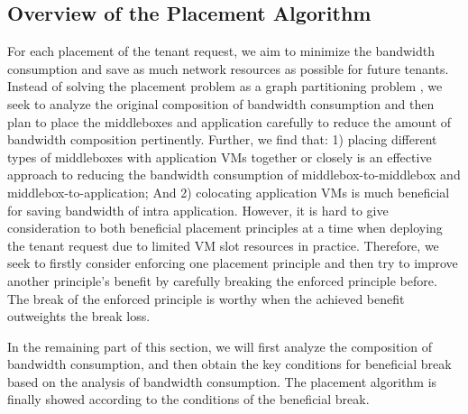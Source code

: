 \documentclass[review]{elsarticle}
\begin{document}

\subsection{Overview of the Placement Algorithm}
For each placement of the tenant request, we aim to minimize the bandwidth consumption and save as much network resources as possible for future tenants. Instead of solving the placement problem as a graph partitioning problem \cite{stratos12}, we seek to analyze the original composition of bandwidth consumption and then plan to place the middleboxes and application carefully to reduce the amount of bandwidth composition pertinently.
Further, we find that: 1) placing different types of middleboxes with application VMs together or closely is an effective approach to reducing the bandwidth consumption of middlebox-to-middlebox and middlebox-to-application; And 2) colocating application VMs is much beneficial for saving bandwidth of intra application. However, it is hard to give consideration to both beneficial placement principles at a time
when deploying the tenant request due to limited VM slot resources in practice. Therefore, we seek to firstly consider enforcing one placement principle and then try to improve another principle's benefit by carefully breaking the enforced principle before. %
The break of the enforced principle is worthy when the achieved benefit outweights the break loss.

In the remaining part of this section, we will first analyze the composition of bandwidth consumption, and then obtain the key conditions for beneficial break based on the analysis of bandwidth consumption. The placement algorithm is finally showed according to the conditions of the beneficial break.   
 

\end{document}
